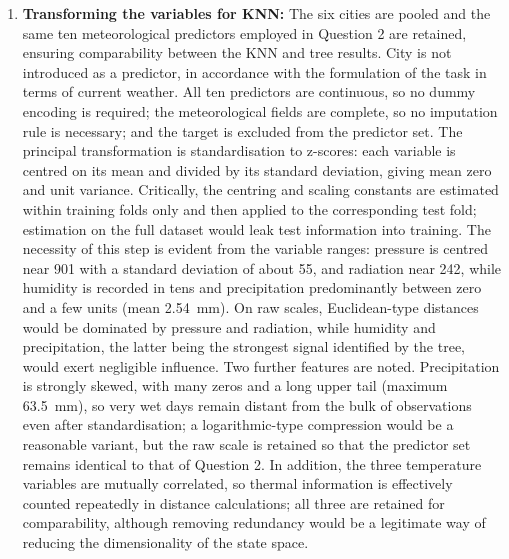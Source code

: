 \documentclass[conference]{IEEEtran}
\begin{document}
\begin{enumerate}
    \item \textbf{Transforming the variables for KNN:} The six cities are pooled and the same ten meteorological predictors employed in Question 2 are retained, ensuring comparability between the KNN and tree results. City is not introduced as a predictor, in accordance with the formulation of the task in terms of current weather. All ten predictors are continuous, so no dummy encoding is required; the meteorological fields are complete, so no imputation rule is necessary; and the target is excluded from the predictor set. The principal transformation is standardisation to z-scores: each variable is centred on its mean and divided by its standard deviation, giving mean zero and unit variance. Critically, the centring and scaling constants are estimated within training folds only and then applied to the corresponding test fold; estimation on the full dataset would leak test information into training. The necessity of this step is evident from the variable ranges: pressure is centred near 901 with a standard deviation of about 55, and radiation near 242, while humidity is recorded in tens and precipitation predominantly between zero and a few units (mean 2.54~mm). On raw scales, Euclidean-type distances would be dominated by pressure and radiation, while humidity and precipitation, the latter being the strongest signal identified by the tree, would exert negligible influence. Two further features are noted. Precipitation is strongly skewed, with many zeros and a long upper tail (maximum 63.5~mm), so very wet days remain distant from the bulk of observations even after standardisation; a logarithmic-type compression would be a reasonable variant, but the raw scale is retained so that the predictor set remains identical to that of Question 2. In addition, the three temperature variables are mutually correlated, so thermal information is effectively counted repeatedly in distance calculations; all three are retained for comparability, although removing redundancy would be a legitimate way of reducing the dimensionality of the state space.


\end{enumerate}
\end{document}
